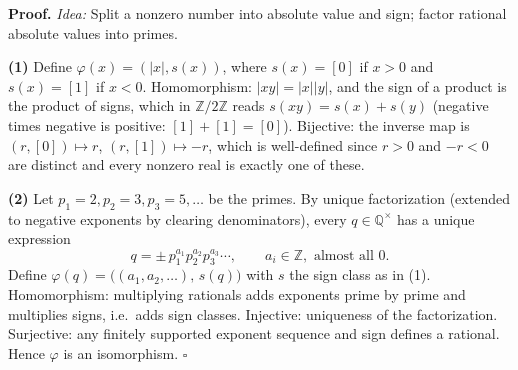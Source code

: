 \documentclass[11pt]{report}
\renewenvironment{proof}[1][Proof]{\noindent\textbf{#1.} }{\hfill$\square$\par\vspace{5pt}}
\begin{document}
\begin{proof}
\textit{Idea:} Split a nonzero number into absolute value and sign; factor rational absolute values into primes.\par
\textbf{(1)} Define $\varphi(x) = (|x|, s(x))$, where $s(x) = [0]$ if $x > 0$ and $s(x) = [1]$ if $x < 0$. Homomorphism: $|xy| = |x||y|$, and the sign of a product is the product of signs, which in $\mathbb{Z}/2\mathbb{Z}$ reads $s(xy) = s(x) + s(y)$ (negative times negative is positive: $[1] + [1] = [0]$). Bijective: the inverse map is $(r, [0]) \mapsto r$, $(r, [1]) \mapsto -r$, which is well-defined since $r > 0$ and $-r < 0$ are distinct and every nonzero real is exactly one of these.

\textbf{(2)} Let $p_1 = 2, p_2 = 3, p_3 = 5, \ldots$ be the primes. By unique factorization (extended to negative exponents by clearing denominators), every $q \in \mathbb{Q}^\times$ has a unique expression
\[ q = \pm\, p_1^{a_1} p_2^{a_2} p_3^{a_3} \cdots, \qquad a_i \in \mathbb{Z}, \text{ almost all } 0. \]
Define $\varphi(q) = \big((a_1, a_2, \ldots),\, s(q)\big)$ with $s$ the sign class as in (1). Homomorphism: multiplying rationals adds exponents prime by prime and multiplies signs, i.e.\ adds sign classes. Injective: uniqueness of the factorization. Surjective: any finitely supported exponent sequence and sign defines a rational. Hence $\varphi$ is an isomorphism.
\end{proof}
\end{document}
